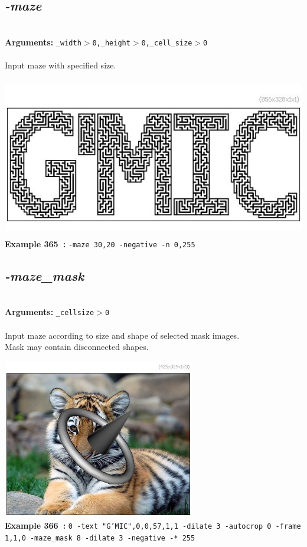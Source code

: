 \documentclass[a4paper,11pt,twoside]{book}
\begin{document}
\subsection{\emph{-maze} }\vspace*{-0.5em}
~\\\textbf{Arguments: } 
{\small \texttt{\_width$>$0,\_height$>$0,\_cell\_size$>$0}}\\~\\
Input maze with specified size.
\begin{center}\includegraphics[keepaspectratio=true,height=7cm,width=\textwidth]{img/gmic_def365.jpg}\\
{\footnotesize \textbf{Example 365~:} \texttt{-maze 30,20 -negative -n 0,255}}
\end{center}

\subsection{\emph{-maze\_mask} }\vspace*{-0.5em}
~\\\textbf{Arguments: } 
{\small \texttt{\_cellsize$>$0}}\\~\\
Input maze according to size and shape of selected mask images.
~\\Mask may contain disconnected shapes.
\begin{center}\includegraphics[keepaspectratio=true,height=7cm,width=\textwidth]{img/gmic_def366.jpg}\\
{\footnotesize \textbf{Example 366~:} \texttt{0 -text "G'MIC",0,0,57,1,1 -dilate 3 -autocrop 0 -frame 1,1,0 -maze\_mask 8 -dilate 3 -negative -* 255}}
\end{center}
\end{document}
